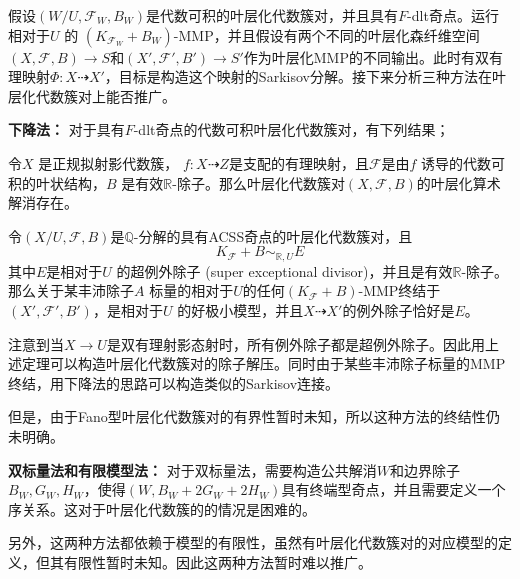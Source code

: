 假设$(W/U,\mathcal{F}_{W},B_{W})$是代数可积的叶层化代数簇对，并且具有$F$-dlt奇点。运行相对于$U$ 的 $(K_{\mathcal{F}_{W}}+B_{W})$-MMP，并且假设有两个不同的叶层化森纤维空间$(X,\mathcal{F},B)\to S$和$(X',\mathcal{F}',B')\to S'$作为叶层化MMP的不同输出。此时有双有理映射$\Phi:X \dashrightarrow X'$，目标是构造这个映射的Sarkisov分解。接下来分析三种方法在叶层化代数簇对上能否推广。

\textbf{下降法：}
对于具有$F$-dlt奇点的代数可积叶层化代数簇对，有下列结果；
\begin{lemma}\cite[Lemma 6.2.4]{chlx}
  令$X$ 是正规拟射影代数簇， $f:X \dashrightarrow Z$是支配的有理映射，且$\mathcal{F}$是由$f$ 诱导的代数可积的叶状结构，$B$ 是有效$\mathbb{R}$-除子。那么叶层化代数簇对$(X,\mathcal{F},B)$的叶层化算术解消存在。
\end{lemma}
\begin{theorem}[压缩超例外除子]\cite[Theorem 9.4.1]{chlx}
 令$(X/U,\mathcal{F},B)$是$\mathbb{Q}$-分解的具有ACSS奇点的叶层化代数簇对，且
 \[ K_{\mathcal{F}}+B \sim_{\mathbb{R},U}E \]
其中$E$是相对于$U$ 的超例外除子 (super exceptional divisor)，并且是有效$\mathbb{R}$-除子。那么关于某丰沛除子$A$ 标量的相对于$U$的任何$(K_{\mathcal{F}}+B)$-MMP终结于$(X',\mathcal{F}',B')$，是相对于$U$ 的好极小模型，并且$X \dashrightarrow X' $的例外除子恰好是$E$。 
\end{theorem}
注意到当$X\to U$是双有理射影态射时，所有例外除子都是超例外除子。因此用上述定理可以构造叶层化代数簇对的除子解压。同时由于某些丰沛除子标量的MMP终结，用下降法的思路可以构造类似的Sarkisov连接。

但是，由于Fano型叶层化代数簇对的有界性暂时未知，所以这种方法的终结性仍未明确。

\textbf{双标量法和有限模型法：}
对于双标量法，需要构造公共解消$W$和边界除子$B_{W},G_{W},H_{W}$，使得$(W,B_{W}+2G_{W}+2H_{W})$具有终端型奇点，并且需要定义一个序关系。这对于叶层化代数簇的的情况是困难的。

另外，这两种方法都依赖于模型的有限性，虽然有叶层化代数簇对的对应模型的定义，但其有限性暂时未知。因此这两种方法暂时难以推广。

